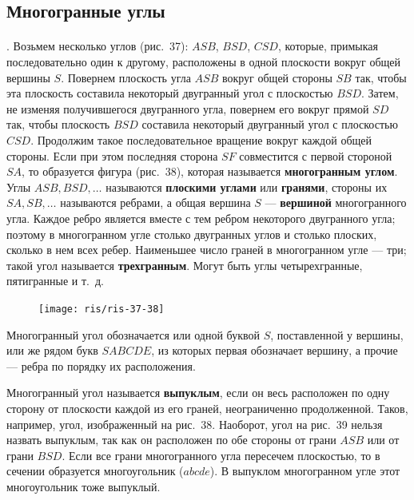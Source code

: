 \documentclass[twoside]{book}
\begin{document}
\subsection*{Многогранные углы}

\paragraph{}\label{1938/s49}
.
Возьмем несколько углов (рис.~37): $ASB$, $BSD$, $CSD$, которые, примыкая последовательно один к другому, расположены в одной плоскости вокруг общей вершины $S$.
Повернем плоскость угла $ASB$ вокруг общей стороны $SB$ так, чтобы эта плоскость составила некоторый двугранный угол с плоскостью $BSD$.
Затем, не изменяя получившегося двугранного угла, повернем его вокруг прямой $SD$ так, чтобы плоскость $BSD$ составила некоторый двугранный угол с плоскостью $CSD$.
Продолжим такое последовательное вращение вокруг каждой общей стороны.
Если при этом последняя сторона $SF$ совместится с первой стороной $SA$, то образуется фигура (рис.~38), которая называется \textbf{многогранным углом}.
Углы $ASB, BSD,\dots$ называются \textbf{плоскими углами} или \textbf{гранями}, стороны их $SA, SB,\dots$ называются ребрами, а общая вершина $S$ --- \textbf{вершиной} многогранного угла.
Каждое ребро является вместе с тем ребром некоторого двугранного угла;
поэтому в многогранном угле столько двугранных углов и столько плоских, сколько в нем всех ребер. %
Наименьшее число граней в многогранном угле --- три;
такой угол называется \textbf{трехгранным}.
Могут быть углы четырехгранные, пятигранные и т.~д.

\begin{figure}[h!]
\centering
\texttt{[image: ris/ris-37-38]}
\caption{}
\end{figure}

Многогранный угол обозначается или одной буквой $S$, поставленной у вершины, или же рядом букв $SABCDE$, из которых первая обозначает вершину, а прочие --- ребра по порядку их расположения.

Многогранный угол называется \textbf{выпуклым}, если он весь расположен по одну сторону от плоскости каждой из его граней, неограниченно продолженной.
Таков, например, угол, изображенный на рис.~38.
Наоборот, угол на рис.~39 нельзя назвать выпуклым, так как он расположен по обе стороны от грани $ASB$ или от грани $BSD$.
Если все грани многогранного угла пересечем плоскостью, то в сечении образуется многоугольник ($abcde$).
В выпуклом многогранном угле этот многоугольник тоже выпуклый.
\end{document}
